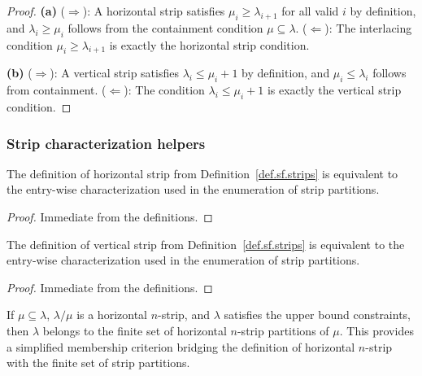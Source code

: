 \begin{proof}
\textbf{(a)} ($\Rightarrow$): A horizontal strip satisfies
$\mu_i \geq \lambda_{i+1}$ for all valid $i$ by definition,
and $\lambda_i \geq \mu_i$ follows from the containment condition
$\mu \subseteq \lambda$.
($\Leftarrow$): The interlacing condition
$\mu_i \geq \lambda_{i+1}$ is exactly the horizontal strip condition.

\textbf{(b)} ($\Rightarrow$): A vertical strip satisfies
$\lambda_i \leq \mu_i + 1$ by definition,
and $\mu_i \leq \lambda_i$ follows from containment.
($\Leftarrow$): The condition $\lambda_i \leq \mu_i + 1$ is exactly
the vertical strip condition.
\end{proof}

\subsubsection{Strip characterization helpers}

\begin{lemma}
\label{lem.sf.horizontal-strip-iff-fun}
\leanhelper
\leanok
The definition of horizontal strip from Definition~\ref{def.sf.strips}
is equivalent to the entry-wise characterization used in the
enumeration of strip partitions.
\end{lemma}

\begin{proof}
Immediate from the definitions.
\end{proof}

\begin{lemma}
\label{lem.sf.vertical-strip-iff-fun}
\leanhelper
\leanok
The definition of vertical strip from Definition~\ref{def.sf.strips}
is equivalent to the entry-wise characterization used in the
enumeration of strip partitions.
\end{lemma}

\begin{proof}
\leanok
Immediate from the definitions.
\end{proof}

\begin{lemma}
\label{lem.sf.mem-horizontal-of-isHorizontalNStrip}
\leanhelper
\leanok
If $\mu \subseteq \lambda$, $\lambda/\mu$ is a horizontal $n$-strip,
and $\lambda$ satisfies the
upper bound constraints, then $\lambda$ belongs to the finite set of
horizontal $n$-strip partitions of $\mu$.
This provides a simplified membership criterion bridging the definition
of horizontal $n$-strip with the finite set of strip partitions.
\end{lemma}

